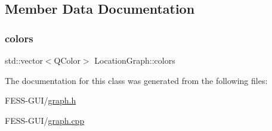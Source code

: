 \subsection{Member Data Documentation}
\hypertarget{class_location_graph_af5c037a973c98ff0a17853f8ef661c7f}{}\label{class_location_graph_af5c037a973c98ff0a17853f8ef661c7f} 
\subsubsection{\texorpdfstring{colors}{colors}}
{\footnotesize\ttfamily std\+::vector$<$Q\+Color$>$ Location\+Graph\+::colors}



The documentation for this class was generated from the following files\+:\begin{DoxyCompactItemize}
\item 
F\+E\+S\+S-\/\+G\+U\+I/\hyperlink{graph_8h}{graph.\+h}\item 
F\+E\+S\+S-\/\+G\+U\+I/\hyperlink{graph_8cpp}{graph.\+cpp}\end{DoxyCompactItemize}
